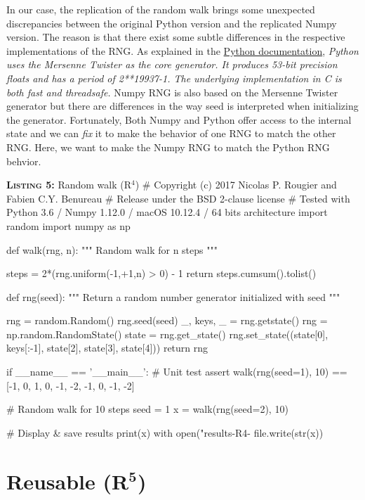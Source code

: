 \documentclass[a4paper,11pt]{article}
\begin{document}
In our case, the replication of the random walk brings some unexpected discrepancies between the original Python version and the replicated Numpy version.
The reason is that there exist some subtle differences in the respective implementations of the RNG.
As explained in the \href{https://docs.python.org/3.6/library/random.html}{Python documentation}, {\em Python uses the Mersenne Twister as the core generator. It produces 53-bit precision floats
and has a period of 2**19937-1.
The underlying implementation in C is both fast and threadsafe.}
Numpy RNG is also based on the Mersenne Twister generator but there are differences in the way seed is interpreted when initializing the generator.
Fortunately, Both Numpy and Python offer access to the internal state and we can {\em fix} it to make the behavior of one RNG to match the other RNG.
Here, we want to make the Numpy RNG to match the Python RNG behvior.

\begin{code}{\textbf{\textsc{Listing 5:}} Random walk (R$^4$)}
# Copyright (c) 2017 Nicolas P. Rougier and Fabien C.Y. Benureau
# Release under the BSD 2-clause license
# Tested with Python 3.6 / Numpy 1.12.0 / macOS 10.12.4 / 64 bits architecture
import random
import numpy as np

def walk(rng, n):
    """ Random walk for n steps """

    steps = 2*(rng.uniform(-1,+1,n) > 0) - 1
    return steps.cumsum().tolist()

def rng(seed):
    """ Return a random number generator initialized with seed """ 
    
    rng = random.Random()
    rng.seed(seed)
    _, keys, _ = rng.getstate()
    rng = np.random.RandomState()
    state = rng.get_state()
    rng.set_state((state[0], keys[:-1], state[2], state[3], state[4]))
    return rng

if __name__ == '__main__':
    # Unit test
    assert walk(rng(seed=1), 10) == [-1, 0, 1, 0, -1, -2, -1, 0, -1, -2]

    # Random walk for 10 steps
    seed = 1
    x = walk(rng(seed=2), 10)

    # Display & save results
    print(x)
    with open("results-R4-%
        file.write(str(x))
\end{code}

\clearpage
\section*{Reusable (R$^{\mathbf 5}$)}
\end{document}
